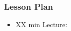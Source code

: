 \begin{frame}
    \frametitle{Lesson Plan}
    \begin{itemize}
        \item XX min Lecture: 
    \end{itemize}
\end{frame}


